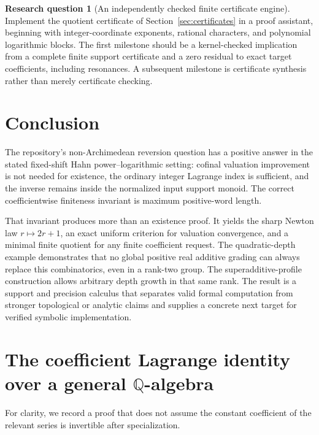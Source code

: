 \documentclass[11pt,a4paper]{article}
\theoremstyle{definition}
\newtheorem{question}[theorem]{Research question}
\theoremstyle{remark}
\newcommand{\Q}{\mathbb Q}
\begin{document}
\begin{question}[An independently checked finite certificate engine]
Implement the quotient certificate of Section~\ref{sec:certificates} in a
proof assistant, beginning with integer-coordinate exponents, rational
characters, and polynomial logarithmic blocks. The first milestone should
be a kernel-checked implication from a complete finite support certificate
and a zero residual to exact target coefficients, including resonances.
A subsequent milestone is certificate synthesis rather than merely
certificate checking.
\end{question}

\section{Conclusion}
The repository's non-Archimedean reversion question has a positive answer
in the stated fixed-shift Hahn power--logarithmic setting: cofinal valuation
improvement is not needed for existence, the ordinary integer Lagrange
index is sufficient, and the inverse remains inside the normalized input
support monoid. The correct coefficientwise finiteness invariant is
maximum positive-word length.

That invariant produces more than an existence proof. It yields the sharp
Newton law $r\mapsto2r+1$, an exact uniform criterion for valuation
convergence, and a minimal finite quotient for any finite coefficient
request. The quadratic-depth example demonstrates that no global positive
real additive grading can always replace this combinatorics, even in a
rank-two group. The superadditive-profile construction allows arbitrary
depth growth in that same rank. The result is a support and precision calculus that
separates valid formal computation from stronger topological or analytic
claims and supplies a concrete next target for verified symbolic
implementation.

\appendix
\section{The coefficient Lagrange identity over a general \texorpdfstring{$\Q$}{Q}-algebra}
\label{app:lagrange}

For clarity, we record a proof that does not assume the constant coefficient
of the relevant series is invertible after specialization.
\end{document}
